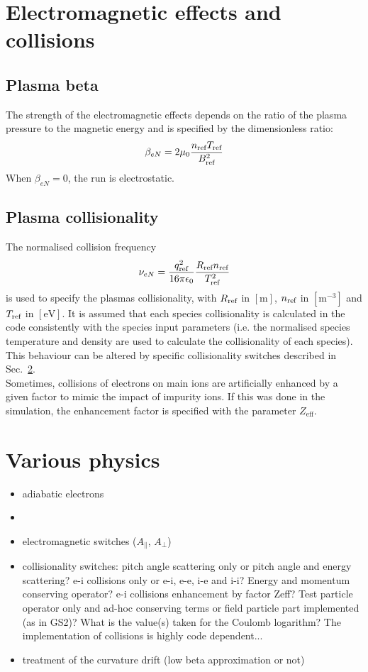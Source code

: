 \documentclass[fleqn]{report}
\begin{document}
\section{Electromagnetic effects and collisions}
\subsection{Plasma beta}
The strength of the electromagnetic effects depends on the ratio of the plasma pressure to the magnetic energy and is specified by the dimensionless ratio:
\begin{equation}
\beta_{eN} = 2\mu_0 \frac{n_{\textrm{ref}} T_{\textrm{ref}}}{B_{\textrm{ref}}^2}
\end{equation}
When $\beta_{eN}=0$, the run is electrostatic. 
 
\subsection{Plasma collisionality}
The normalised collision frequency
\begin{equation}
 \nu_{eN} = \frac{q_{\textrm{ref}}^2}{16\pi\epsilon_0}\frac{R_{\textrm{ref}} n_{\textrm{ref}}}{T_{\textrm{ref}}^2}
\end{equation}
is used to specify the plasmas collisionality, with $R_{\textrm{ref}}$ in $[\textrm{m}]$, $n_{\textrm{ref}}$ in $[\textrm{m}^{-3}]$ and $T_{\textrm{ref}}$ in $[\textrm{eV}]$. It is assumed that each species collisionality is calculated in the code consistently with the species input parameters (i.e. the normalised species temperature and density are used to calculate the collisionality of each species). This behaviour can be altered by specific collisionality switches described in Sec.~\ref{sec:various}.\\
Sometimes, collisions of electrons on main ions are artificially enhanced by a given factor to mimic the impact of impurity ions. If this was done in the simulation, the enhancement factor is specified with the parameter $Z_\textrm{eff}$.


\section{Various physics} \label{sec:various}
\begin{itemize}
\item adiabatic electrons
\item 
\item electromagnetic switches ($A_\parallel$, $A_\perp$)
\item collisionality switches: pitch angle scattering only or pitch angle and energy scattering? e-i collisions only or e-i, e-e, i-e and i-i? Energy and momentum conserving operator? e-i collisions enhancement by factor Zeff? Test particle operator only and ad-hoc conserving terms or field particle part implemented (as in GS2)? What is the value(s) taken for the Coulomb logarithm? The implementation of collisions is highly code dependent...
\item treatment of the curvature drift (low beta approximation or not)
\end{itemize}
\end{document}

